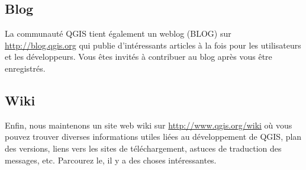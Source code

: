 
\subsection{Blog}
La communauté QGIS tient également un weblog (BLOG) sur
\url{http://blog.qgis.org} qui publie d'intéressants articles à la fois pour les
utilisateurs et les développeurs. Vous êtes invités à contribuer au blog après
vous être enregistrés.

\subsection{Wiki}
Enfin, nous maintenons un site web wiki sur \url{http://www.qgis.org/wiki} où vous
pouvez trouver diverses informations utiles liées au développement de QGIS, plan
des versions, liens vers les sites de téléchargement, astuces de
traduction des messages, etc. Parcourez le, il y a des choses intéressantes.
